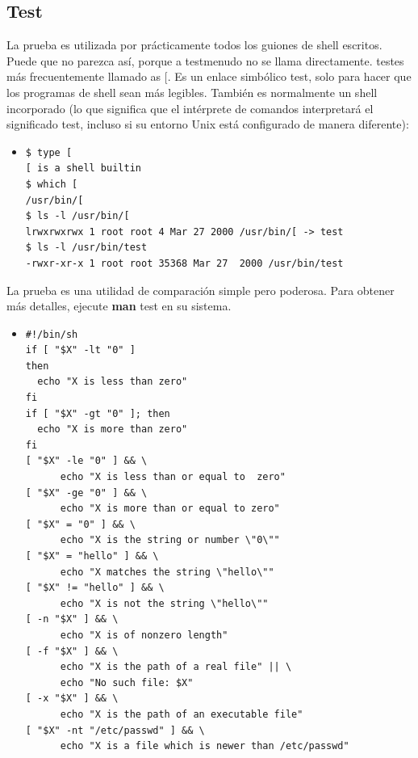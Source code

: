 \documentclass[12pt,letterpaper]{article}
\begin{document}
{        \subsection{Test}
        La prueba es utilizada por prácticamente todos los guiones de shell escritos. Puede que no parezca así, porque a testmenudo no se llama directamente. testes más frecuentemente llamado as $ [ $. Es un enlace simbólico test, solo para hacer que los programas de shell sean más legibles. También es normalmente un shell incorporado (lo que significa que el intérprete de comandos interpretará el significado test, incluso si su entorno Unix está configurado de manera diferente):
        \color{red}
        \begin{itemize}
        \item \begin{verbatim}
$ type [
[ is a shell builtin
$ which [
/usr/bin/[
$ ls -l /usr/bin/[
lrwxrwxrwx 1 root root 4 Mar 27 2000 /usr/bin/[ -> test
$ ls -l /usr/bin/test
-rwxr-xr-x 1 root root 35368 Mar 27  2000 /usr/bin/test
        \end{verbatim}
        \end{itemize}
        \color{black}
        La prueba es una utilidad de comparación simple pero poderosa. Para obtener más detalles, ejecute \textbf{man} test en su sistema.
        \color{red}
        \begin{itemize}
        
        \item \begin{verbatim}
#!/bin/sh
if [ "$X" -lt "0" ]
then
  echo "X is less than zero"
fi
if [ "$X" -gt "0" ]; then
  echo "X is more than zero"
fi
[ "$X" -le "0" ] && \
      echo "X is less than or equal to  zero"
[ "$X" -ge "0" ] && \
      echo "X is more than or equal to zero"
[ "$X" = "0" ] && \
      echo "X is the string or number \"0\""
[ "$X" = "hello" ] && \
      echo "X matches the string \"hello\""
[ "$X" != "hello" ] && \
      echo "X is not the string \"hello\""
[ -n "$X" ] && \
      echo "X is of nonzero length"
[ -f "$X" ] && \
      echo "X is the path of a real file" || \
      echo "No such file: $X"
[ -x "$X" ] && \
      echo "X is the path of an executable file"
[ "$X" -nt "/etc/passwd" ] && \
      echo "X is a file which is newer than /etc/passwd"
        \end{verbatim}
        \end{itemize}
        \color{black}
}
\end{document}
